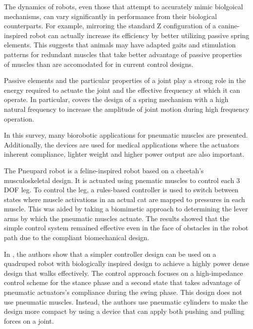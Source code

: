 
The dynamics of robots, even those that attempt to accurately mimic biolgoical
mechanisms, can vary significantly in performance from their biological
counterparts. For example, mirroring the standard Z configuration of a canine-
inspired robot can actually increase its efficiency by better utilizing passive
spring elements. This suggests that animals may have adapted gaits and
stimulation patterns for redundant muscles that take better advantage of passive
properties of muscles than are accomodated for in current control designs.
\cite{HindLegMorphology}

Passive elements and the particular properties of a joint play a strong role in
the energy required to actuate the joint and the effective frequency at which it
can operate. In particular, \cite{Na2015} covers the design of a spring
mechanism with a high natural frequency to increase the amplitude of joint
motion during high frequency operation.



In this survey, many biorobotic applications for pneumatic muscles are presented.
Additionally, the devices are used for medical applications where the actuators
inherent compliance, lighter weight and higher power output are also important. 

The Pneupard robot is a feline-inspired robot based on a cheetah's
musculoskeletal design. It is actuated using pnematic muscles to control each 3
DOF leg. To control the leg, a rules-based controller is used to switch between
states where muscle activations in an actual cat are mapped to pressures in each
muscle. This was aided by taking a biomimetic approach to determining the lever
arms by which the pneumatic muscles actuate. The results showed that the simple
control system remained effective even in the face of obstacles in the robot
path due to the compliant biomechanical design.
\cite{Pneupard2013}

In \cite{Wait2014}, the authors show that a simpler controller design can be
used on a quadruped robot with biologically inspired design to achieve a highly
power dense design that walks effectively. The control approach focuses on
a high-impedance control scheme for the stance phase and a second state
that takes advantage of pneumatic actuators's compliance during the swing phase.
This design does not use pneumatic muscles. Instead, the authors use pneumatic
cylinders to make the design more compact by using a device that can apply both
pushing and pulling forces on a joint. 


